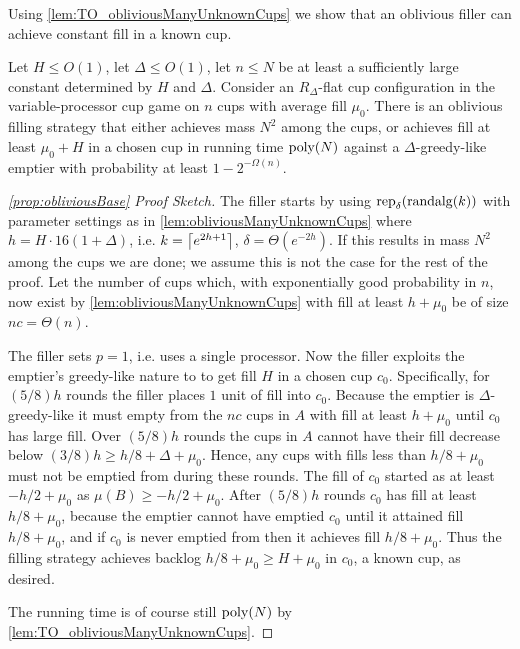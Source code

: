 Using \cref{lem:TO_obliviousManyUnknownCups} we show that an
oblivious filler can achieve constant fill in a known cup.
\begin{proposition}
  \label{prop:TO_obliviousBase}
  Let $H \le O(1)$, let $\Delta \le O(1)$, let $n\le N$ be at least a
  sufficiently large constant determined by $H$ and $\Delta$. 
  Consider an $R_\Delta$-flat cup configuration in the variable-processor cup
  game on $n$ cups with average fill $\mu_0$.
  There is an oblivious filling strategy that either
  achieves mass $N^2$ among the cups, or achieves fill at least $\mu_0 + H$
  in a chosen cup in running time $\operatorname{\text{poly}}(N)$ against a
  $\Delta$-greedy-like emptier with probability at least $1-2^{-\Omega(n)}.$
\end{proposition}
\begin{proof}[\cref{prop:obliviousBase} Proof Sketch]
  The filler starts by using $\operatorname{\text{\textup{rep}}}_\delta(\operatorname{\text{\textup{randalg}}}(k))$ with
  parameter settings as in \cref{lem:obliviousManyUnknownCups}
  where $h = H\cdot 16(1+\Delta)$, i.e. $k = \left\lceil e^{2h+1} \right\rceil$,
  $\delta = \Theta(e^{-2h})$. 
  If this results in mass $N^2$ among the cups we are done; we
  assume this is not the case for the rest of the proof.
  Let the number of cups which, with exponentially good
  probability in $n$, now exist by
  \cref{lem:obliviousManyUnknownCups} with
  fill at least $h+\mu_0$ be of size $nc = \Theta(n)$.

  The filler sets $p=1$, i.e. uses a single processor. Now the
  filler exploits the emptier's greedy-like nature to to get fill
  $H$ in a chosen cup $c_0$. Specifically, for $(5/8)h$ rounds
  the filler places $1$ unit of fill into $c_0$. Because the
  emptier is $\Delta$-greedy-like it must empty from the $nc$
  cups in $A$ with fill at least $h+\mu_0$ until $c_0$ has large
  fill. Over $(5/8)h$ rounds the cups in $A$ cannot have their
  fill decrease below $(3/8)h \ge h/8 + \Delta + \mu_0$. Hence,
  any cups with fills less than $h/8+\mu_0$ must not be emptied
  from during these rounds. The fill of $c_0$ started as at least
  $-h/2+\mu_0$ as $\mu(B) \ge -h/2+\mu_0$. After $(5/8)h$ rounds
  $c_0$ has fill at least $h/8+\mu_0$, because the emptier cannot
  have emptied $c_0$ until it attained fill $h/8+\mu_0$, and if
  $c_0$ is never emptied from then it achieves fill $h/8+\mu_0$.
  Thus the filling strategy achieves backlog $h/8 +\mu_0 \ge H +
  \mu_0$ in $c_0$, a known cup, as desired.

  The running time is of course still $\operatorname{\text{poly}}(N)$ by
  \cref{lem:TO_obliviousManyUnknownCups}.
\end{proof}

